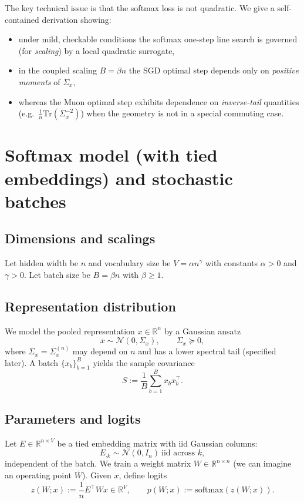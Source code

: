 \documentclass[11pt]{article}
\begin{document}
The key technical issue is that the softmax loss is not quadratic. We give a self-contained derivation showing:
\begin{itemize}
\item under mild, checkable conditions the softmax one-step line search is governed (for \emph{scaling}) by a local quadratic surrogate,
\item in the coupled scaling $B=\beta n$ the SGD optimal step depends only on \emph{positive moments} of $\Sigma_x$,
\item whereas the Muon optimal step exhibits dependence on \emph{inverse-tail} quantities (e.g.\ $\tfrac1n\mathrm{Tr}(\Sigma_x^{-2})$) when the geometry is not in a special commuting case.
\end{itemize}

\section{Softmax model (with tied embeddings) and stochastic batches}

\subsection{Dimensions and scalings}
Let hidden width be $n$ and vocabulary size be $V=\alpha n^\gamma$ with constants $\alpha>0$ and $\gamma>0$.
Let batch size be $B=\beta n$ with $\beta\ge 1$.

\subsection{Representation distribution}
We model the pooled representation $x\in\mathbb{R}^n$ by a Gaussian ansatz
\[
x \sim \mathcal{N}(0,\Sigma_x),
\qquad \Sigma_x\succeq 0,
\]
where $\Sigma_x=\Sigma_x^{(n)}$ may depend on $n$ and has a lower spectral tail (specified later).
A batch $\{x_b\}_{b=1}^B$ yields the sample covariance
\[
S := \frac{1}{B}\sum_{b=1}^B x_b x_b^\top.
\]

\subsection{Parameters and logits}
Let $E\in\mathbb{R}^{n\times V}$ be a tied embedding matrix with iid Gaussian columns:
\[
E_{\cdot k}\sim \mathcal{N}(0,I_n)\ \text{iid across }k,
\]
independent of the batch.
We train a weight matrix $W\in\mathbb{R}^{n\times n}$ (we can imagine an operating point $\bar W$).
Given $x$, define logits
\[
z(W;x) := \frac{1}{n}E^\top W x \in \mathbb{R}^V,
\qquad
p(W;x) := \mathrm{softmax}(z(W;x)).
\]
\end{document}
